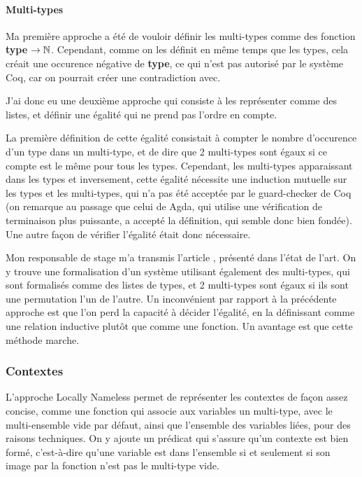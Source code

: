 \documentclass[10pt]{article}
\begin{document}
\paragraph{Multi-types} Ma première approche a été de vouloir définir les multi-types comme des fonction \textbf{type} $\rightarrow \mathbb{N}$. Cependant, comme on les définit en même temps que les types, cela créait une occurence négative de \textbf{type}, ce qui n'est pas autorisé par le système Coq, car on pourrait créer une contradiction avec. 

J'ai donc eu une deuxième approche qui consiste à les représenter comme des listes, et définir une égalité qui ne prend pas l'ordre en compte. 

La première définition de cette égalité consistait à compter le nombre d'occurence d'un type dans un multi-type, et de dire que 2 multi-types sont égaux si ce compte est le même pour tous les types. Cependant, les multi-types apparaissant dans les types et inversement, cette égalité nécessite une induction mutuelle sur les types et les multi-types, qui n'a pas été acceptée par le guard-checker de Coq (on remarque au passage que celui de Agda, qui utilise une vérification de terminaison plus puissante, a accepté la définition, qui semble donc bien fondée). Une autre façon de vérifier l'égalité était donc nécessaire.

Mon responsable de stage m'a transmis l'article \cite{agda}, présenté dans l'état de l'art. On y trouve une formalisation d'un système utilisant également des multi-types, qui sont formalisés comme des listes de types, et 2 multi-types sont égaux si ils sont une permutation l'un de l'autre. Un inconvénient   par rapport à la précédente approche est que l'on perd la capacité à décider l'égalité, en la définissant comme une relation inductive plutôt que comme une fonction. Un avantage est que cette méthode marche.

\subsubsection{Contextes}
L'approche Locally Nameless permet de représenter les contextes de façon assez concise, comme une fonction qui associe aux variables un multi-type, avec le multi-ensemble vide par défaut, ainsi que l'ensemble des variables liées, pour des raisons techniques. On y ajoute un prédicat qui s'assure qu'un contexte est bien formé, c'est-à-dire qu'une variable est dans l'ensemble si et seulement si son image par la fonction n'est pas le multi-type vide.
\end{document}
